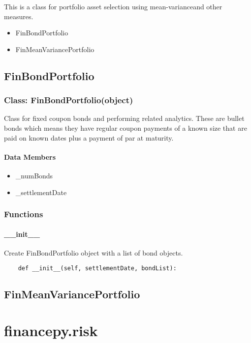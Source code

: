 \documentclass[twoside,11pt]{book}
\begin{document}
This is a class for portfolio asset selection using mean-varianceand other measures.

\begin{itemize}
\item{ FinBondPortfolio
}
\item{ FinMeanVariancePortfolio
}
\end{itemize}
\newpage
\section{FinBondPortfolio}

\subsection*{Class: FinBondPortfolio(object)}
Class for fixed coupon bonds and performing related analytics. These are bullet bonds which means they have regular coupon payments of a known size that are paid on known dates plus a payment of par at maturity. 

\subsubsection*{Data Members}
\begin{itemize}
\item{\_numBonds}
\item{\_settlementDate}
\end{itemize}

\subsection*{Functions}

\subsubsection*{{\bf \_\_init\_\_}}
Create FinBondPortfolio object with a list of bond objects.  

\begin{lstlisting}
    def __init__(self, settlementDate, bondList):
\end{lstlisting}

\newpage
\section{FinMeanVariancePortfolio}


\chapter{financepy.risk}
\end{document}
